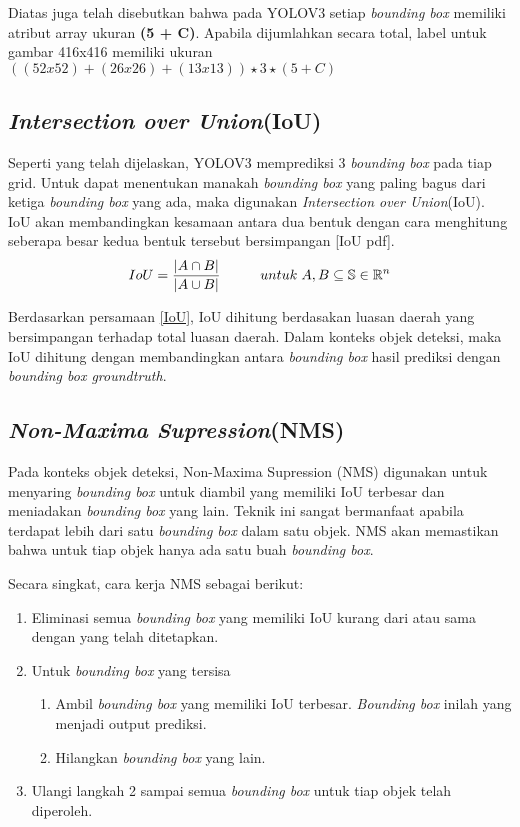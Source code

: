 \documentclass[../thesis.tex]{subfiles}
\begin{document}
Diatas juga telah disebutkan bahwa pada YOLOV3 setiap \textit{bounding box} memiliki atribut array ukuran \textbf{(5 + C)}. Apabila dijumlahkan secara total, label untuk gambar 416x416 memiliki ukuran $((52x52)+(26x26)+(13x13))\star 3 \star (5+C)$

\subsection{\textit{Intersection over Union}(IoU)}
Seperti yang telah dijelaskan, YOLOV3 memprediksi 3 \textit{bounding box} pada tiap grid. Untuk dapat menentukan manakah \textit{bounding box} yang paling bagus dari ketiga \textit{bounding box} yang ada, maka digunakan \textit{Intersection over Union}(IoU). 
IoU akan membandingkan kesamaan antara dua bentuk dengan cara menghitung seberapa besar kedua bentuk tersebut bersimpangan [IoU pdf].
\begin{equation} \label{IoU}
	IoU = \frac{|A \cap B|}{|A \cup B|}	\hspace{10mm} untuk \hspace{1mm}A,B \subseteq \mathbb{S} \in \mathbb{R}^n
\end{equation}

Berdasarkan persamaan \ref{IoU}, IoU dihitung berdasakan luasan daerah yang bersimpangan terhadap total luasan daerah.
Dalam konteks objek deteksi, maka IoU dihitung dengan membandingkan antara \textit{bounding box} hasil prediksi dengan \textit{bounding box groundtruth}.

\subsection{\textit{Non-Maxima Supression}(NMS)}
Pada konteks objek deteksi, Non-Maxima Supression (NMS) digunakan untuk menyaring \textit{bounding box} untuk diambil yang memiliki IoU terbesar dan meniadakan \textit{bounding box} yang lain. 
Teknik ini sangat bermanfaat apabila terdapat lebih dari satu \textit{bounding box} dalam satu objek. NMS akan memastikan bahwa untuk tiap objek hanya ada satu buah \textit{bounding box}. 

Secara singkat, cara kerja NMS sebagai berikut:
\begin{enumerate}
	\item Eliminasi semua \textit{bounding box} yang memiliki IoU kurang dari atau sama dengan yang telah ditetapkan.
	\item Untuk \textit{bounding box} yang tersisa
	\begin{enumerate}
		\item Ambil \textit{bounding box} yang memiliki IoU terbesar. \textit{Bounding box} inilah yang menjadi output prediksi.
		\item Hilangkan \textit{bounding box} yang lain.
	\end{enumerate}
	\item Ulangi langkah 2 sampai semua \textit{bounding box} untuk tiap objek telah diperoleh.
\end{enumerate}
\end{document}
